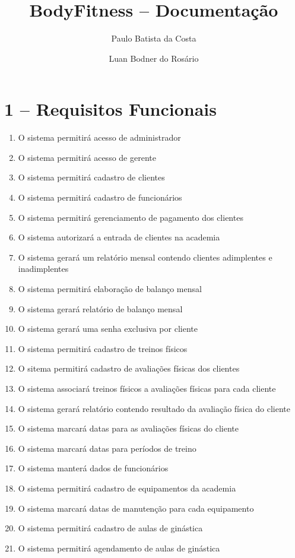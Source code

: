 \documentclass[12pt,a4paper,oneside]{report}
\author{Paulo Batista da Costa \and Luan Bodner do Rosário}
\title{BodyFitness -- Documentação}
\begin{document}
	\maketitle
	\section*{1 -- Requisitos Funcionais}

	\begin{enumerate}
		
		 \item O sistema permitirá acesso de administrador
		 \item O sistema permitirá acesso de gerente
		 \item O sistema permitirá cadastro de clientes
		 \item O sistema permitirá cadastro de funcionários
		 \item O sistema permitirá gerenciamento de pagamento dos clientes
		 \item O sistema autorizará a entrada de clientes na academia
		 \item O sistema gerará um relatório mensal contendo clientes adimplentes e inadimplentes 
		 \item O sistema permitirá elaboração de balanço mensal
		 \item O sistema gerará relatório de balanço mensal
		 \item O sistema gerará uma senha exclusiva por cliente
		 \item O sistema permitirá cadastro de treinos físicos
		 \item O sitema permitirá cadastro de avaliações físicas dos clientes
		 \item O sistema associará treinos físicos a avaliações físicas para cada cliente
		 \item O sistema gerará relatório contendo resultado da avaliação física do cliente
		 \item O sistema marcará datas para as avaliações físicas do cliente
		 \item O sistema marcará datas para períodos de treino
		 \item O sistema manterá dados de funcionários
		 \item O sistema permitirá cadastro de equipamentos da academia
		 \item O sistema marcará datas de manutenção para cada equipamento
		 \item O sistema permitirá cadastro de aulas de ginástica
		 \item O sistema permitirá agendamento de aulas de ginástica
	

	\end{enumerate}
\end{document}
